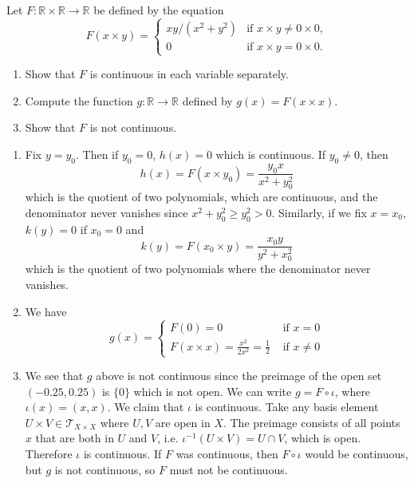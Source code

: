   \begin{exercise}[Munkres 18.12]
    Let $F : \mathbb{R} \times \mathbb{R} \to \mathbb{R}$ be defined by the equation
    \begin{equation}
      F(x \times y) = \begin{cases}
        xy/(x^2 + y^2) & \text{if } x \times y \neq 0 \times 0, \\
        0              & \text{if } x \times y = 0 \times 0.
      \end{cases}
    \end{equation}
    \begin{enumerate}
      \item Show that $F$ is continuous in each variable separately.
      \item Compute the function $g : \mathbb{R} \to \mathbb{R}$ defined by $g(x) = F(x \times x)$.
      \item Show that $F$ is not continuous.
    \end{enumerate}
  \end{exercise}
  \begin{solution}
    \begin{enumerate}
      \item Fix $y = y_0$. Then if $y_0 = 0$, $h(x) = 0$ which is continuous. If $y_0 \neq 0$, then 
      \begin{equation}
        h(x) = F(x \times y_0) = \frac{y_0 x}{x^2 + y_0^2}
      \end{equation}
      which is the quotient of two polynomials, which are continuous, and the denominator never vanishes since $x^2 + y_0^2 \geq y_0^2 > 0$. Similarly, if we fix $x = x_0$, $k(y) = 0$ if $x_0 = 0$ and 
      \begin{equation}
        k(y) = F(x_0 \times y) = \frac{x_0 y}{y^2 + x_0^2}
      \end{equation}
      which is the quotient of two polynomials where the denominator never vanishes. 

      \item We have 
      \begin{equation}
        g(x) = \begin{cases} 
          F(0) = 0 & \text{ if } x = 0 \\
          F(x \times x) = \frac{x^2}{2 x^2} = \frac{1}{2} & \text{ if } x \neq 0
        \end{cases}
      \end{equation}

      \item We see that $g$ above is not continuous since the preimage of the open set $(-0.25, 0.25)$ is $\{0\}$ which is not open. We can write $g = F \circ \iota$, where $\iota(x) = (x, x)$. We claim that $\iota$ is continuous. Take any basis element $U \times V \in \mathscr{T}_{X \times X}$ where $U, V$ are open in $X$. The preimage consists of all points $x$ that are both in $U$ and $V$, i.e. $\iota^{-1} (U \times V) = U \cap V$, which is open.  Therefore $\iota$ is continuous. If $F$ was continuous, then $F \circ \iota$ would be continuous, but $g$ is not continuous, so $F$ must not be continuous. 
    \end{enumerate}
  \end{solution}

